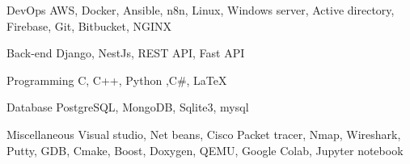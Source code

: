 

\begin{cvskills}

  \cvskill
    {DevOps} %
    {AWS, Docker, Ansible, n8n, Linux, Windows server, Active directory, Firebase, Git, Bitbucket, NGINX} %

  \cvskill
    {Back-end} %
    {Django, NestJs, REST API, Fast API} %


  \cvskill
    {Programming} %
    {C, C++, Python ,C#, LaTeX} %

  \cvskill
    {Database} %
    {PostgreSQL, MongoDB, Sqlite3, mysql} %

  \cvskill
    {Miscellaneous} %
    {Visual studio, Net beans, Cisco Packet tracer, Nmap, Wireshark, Putty, GDB, Cmake, Boost, Doxygen, QEMU, Google Colab, Jupyter notebook} %


\end{cvskills}
